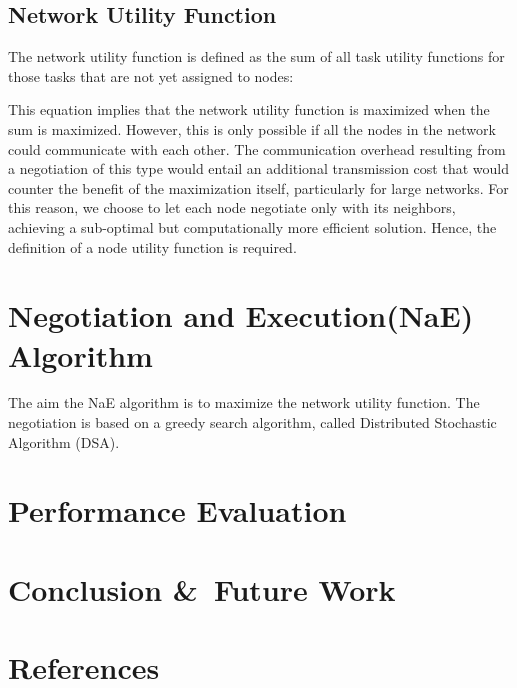 \documentclass[a4paper]{article}
\begin{document}
\subsection{Network Utility Function}
The network utility function is defined as the sum of all task utility functions for those tasks that are not yet assigned to nodes: 

This equation implies that the network utility function is maximized when the sum is maximized. However, this is only possible if all the nodes in the network could communicate with each other. The communication overhead resulting from a negotiation of this type would entail an additional transmission cost that would counter the  benefit of the maximization itself, particularly for large networks. For this reason, we choose to let each node negotiate only with its neighbors, achieving a sub-optimal but computationally more efficient solution. Hence, the definition of a node utility function is required.\\



\section{Negotiation and Execution(NaE) Algorithm}
The aim the NaE algorithm is to maximize the network utility function.  The negotiation is based on a greedy search algorithm, called Distributed Stochastic Algorithm (DSA). 

\section{Performance Evaluation}
\section{Conclusion \&\ Future Work}
\section{References}
%
\end{document}
